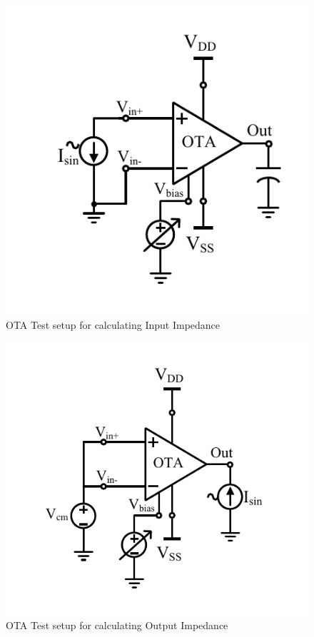 \begin{figure} [H]
\centering
\includegraphics[scale=1]{Figures/Test_Benches/OTA/OTA_Zin.pdf}
\caption{OTA Test setup for calculating Input Impedance}
\end{figure}

\begin{figure} [H]
\centering
\includegraphics[scale=1]{Figures/Test_Benches/OTA/OTA_Zout.pdf}
\caption{OTA Test setup for calculating Output Impedance}
\end{figure}

